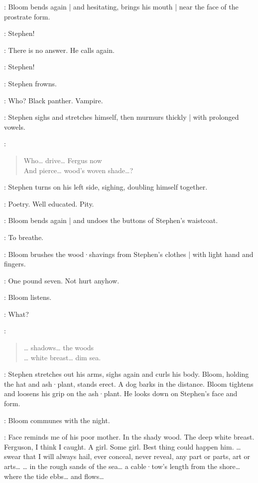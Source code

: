 :
Bloom bends again |
and hesitating,
brings his mouth |
near the face of the prostrate form.

\Bloom:
Stephen!

:
There is no answer.
He calls again.

\Bloom:
Stephen!

:
Stephen frowns.

\Stephen:
Who?
Black panther.
Vampire.

:
Stephen sighs and stretches himself,
then murmurs thickly |
with prolonged vowels.

\Stephen:
\begin{verse}
    Who… drive… Fergus now\\
    And pierce… wood's woven shade…?
\end{verse}

:
Stephen turns on his left side,
sighing,
doubling himself together.

\Bloom:
Poetry.
Well educated.
Pity.

:
Bloom bends again |
and undoes the buttons of Stephen's waistcoat.

\Bloom:
To breathe.

:
Bloom brushes the wood·shavings from Stephen's clothes |
with light hand and fingers.

\Bloom:
One pound seven.
Not hurt anyhow.

:
Bloom listens.

\Bloom:
What?

\Stephen:
\begin{verse}
   … shadows… the woods\\
   … white breast… dim sea.
\end{verse}

:
Stephen stretches out his arms,
sighs again and curls his body.
Bloom,
holding the hat and ash·plant,
stands erect.
A dog barks in the distance.
Bloom tightens and loosens his grip on the ash·plant.
He looks down on Stephen's face and form.

:
Bloom communes with the night.

\Bloom:
Face reminds me of his poor mother.
In the shady wood.
The deep white breast.
Ferguson,
I think I caught.
%
A girl.
Some girl.
Best thing could happen him.
… swear that I will always hail,
ever conceal,
never reveal,
any part or parts,
art or arts…
… in the rough sands of the sea…
a cable·tow's length from the shore…
where the tide ebbs…
and flows…

